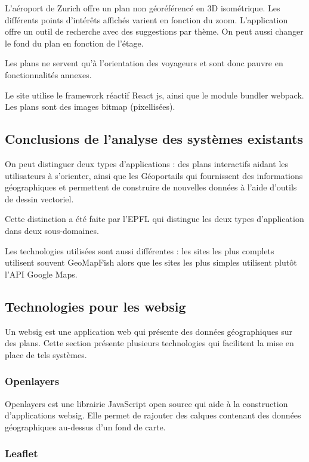 \documentclass[
    iai, %
    il, %
]{heig-tb}
\begin{document}
L'aéroport de Zurich \cite{zurich-aeroport} offre un plan non géoréférencé en 3D isométrique.
Les différents points d'intérêts affichés varient en fonction du zoom.
L'application offre un outil de recherche avec des suggestions par thème.
On peut aussi changer le fond du plan en fonction de l'étage.

Les plans ne servent qu'à l'orientation des voyageurs et sont donc pauvre en fonctionnalités annexes.

Le site utilise le framework réactif React js, ainsi que le module bundler webpack. Les plans sont des images bitmap (pixellisées).

\subsection{Conclusions de l'analyse des systèmes existants}
On peut distinguer deux types d'applications :
des plans interactifs aidant les utilisateurs à s'orienter, ainsi que les Géoportails qui fournissent des informations géographiques
et permettent de construire de nouvelles données à l'aide d'outils de dessin vectoriel.

Cette distinction a été faite par l'EPFL qui distingue les deux types d'application dans deux sous-domaines.

Les technologies utilisées sont aussi différentes : les sites les plus complets utilisent souvent GeoMapFish alors que les sites les plus simples utilisent plutôt l'API Google Maps.


\subsection{Technologies pour les \gls{websig}}
Un \gls{websig} est une application web qui présente des données géographiques sur des plans.
Cette section présente plusieurs technologies qui facilitent la mise en place de tels systèmes.

\subsubsection{Openlayers}
Openlayers \cite{openlayers} est une librairie JavaScript open source qui aide à la construction d'applications \gls{websig}.
Elle permet de rajouter des calques contenant des données géographiques au-dessus d'un fond de carte.

\subsubsection{Leaflet}
\end{document}
